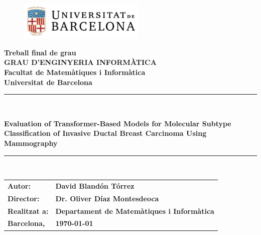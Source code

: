 \documentclass[a4paper,10pt]{book}
\begin{document}
\pagestyle{empty}

\begin{titlepage}
	\begin{center}
		\begin{figure}[htb]
			\begin{center}
				\includegraphics[width=6cm]{assets/ub_color.pdf}
			\end{center}
		\end{figure}
		
		\def\worktitle{Development of an AI-Based Tool for Molecular Subtype Classification of Invasive Ductal Breast Carcinoma Using Mammography}
		
		\textbf{\LARGE Treball final de grau} \\
		\vspace*{.5cm}
		\textbf{\LARGE GRAU D'ENGINYERIA INFORM\`{A}TICA } \\
		\vspace*{.5cm}
		\textbf{\LARGE Facultat de Matem\`atiques i Inform\`atica\\ Universitat de Barcelona} \\
		\vspace*{1.0cm}
		\rule{16cm}{0.1mm}\\
		\begin{Huge}
			\textbf{Evaluation of Transformer-Based Models for Molecular Subtype Classification of Invasive Ductal Breast Carcinoma Using Mammography} \\
		\end{Huge}
		\rule{16cm}{0.1mm}\\
		
		\vspace{1cm}
		
		\begin{flushright}
			
			
			\vspace*{2.5cm}
			
			\hfill
			
			\renewcommand{\arraystretch}{1.5}
			\begin{tabular}{ll}
				\textbf{\small Autor:}       & \textbf{\small David Bland\'on T\'orrez }                             \\
				\textbf{\small Director:}    & \textbf{\small Dr. Oliver D\'iaz Montesdeoca }                        \\
				\textbf{\small Realitzat a:} & \textbf{\small  Departament de Matem\`{a}tiques i  Inform\`{a}tica  } \\
				\textbf{\small Barcelona,}   & \textbf{\small \today }                                               
			\end{tabular}
			
		\end{flushright}
		
	\end{center}
	
\end{titlepage}
\end{document}
